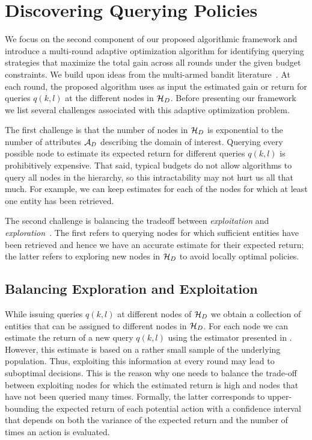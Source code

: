 

\section{Discovering Querying Policies}
\label{sec:solving}
We focus on the second component of our proposed algorithmic framework and introduce a multi-round adaptive optimization algorithm for identifying querying strategies that maximize the total gain across all rounds under the given budget constraints. We build upon ideas from the multi-armed bandit literature~\cite{Auer:2003,EvenDar06actionelimination}. At each round, the proposed algorithm uses as input the estimated gain or return for queries $q(k,l)$ at the different nodes in $\mathcal{H}_D$. Before presenting our framework we list several challenges associated with this adaptive optimization problem.

\squishlist
\item The first challenge is that the number of nodes in $\mathcal{H}_D$ is exponential to the number of attributes $\mathcal{A}_D$ describing the domain of interest. Querying every possible node to estimate its expected return for different queries $q(k,l)$ is prohibitively expensive. That said, typical budgets do not allow algorithms to query all nodes in the hierarchy, so this intractability may not hurt us all that much. For example, we can keep estimates for each of the nodes for which at least one entity has been retrieved.
\item The second challenge is balancing the tradeoff between {\em exploitation} and {\em exploration}~\cite{Auer:2003}. The first refers to querying nodes for which sufficient entities have been retrieved and hence we have an accurate estimate for their expected return; the latter refers to exploring new nodes in $\mathcal{H}_D$ to avoid locally optimal policies.
\squishend

\subsection{Balancing Exploration and Exploitation}
\label{sec:balancing}
While issuing queries $q(k,l)$ at different nodes of $\mathcal{H}_D$ we obtain a collection of entities that can be assigned to different nodes in $\mathcal{H}_D$. For each node we can estimate the return of a new query $q(k,l)$ using the estimator presented in . However, this estimate is based on a rather small sample of the underlying population. Thus, exploiting this information at every round may lead to suboptimal decisions. This is the reason why one needs to balance the trade-off between exploiting nodes for which the estimated return is high and nodes that have not been queried many times. Formally, the latter corresponds to upper-bounding the expected return of each potential action with a confidence interval that depends on both the variance of the expected return and the number of times an action is evaluated.

